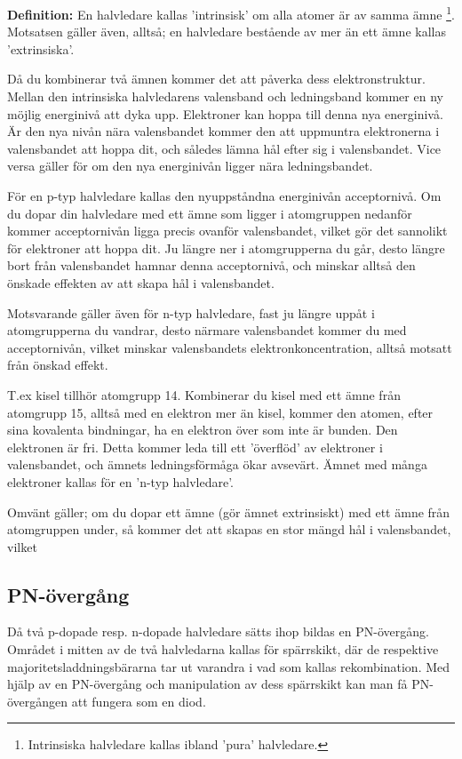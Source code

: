 \textbf{Definition:} En halvledare kallas 'intrinsisk' om alla atomer är av samma ämne \footnote{Intrinsiska halvledare kallas ibland 'pura' halvledare.}. Motsatsen gäller även, alltså; en halvledare bestående av mer än ett ämne kallas 'extrinsiska'.

Då du kombinerar två ämnen kommer det att påverka dess elektronstruktur. Mellan den intrinsiska halvledarens valensband och ledningsband kommer en ny möjlig energinivå att dyka upp. Elektroner kan hoppa till denna nya energinivå. Är den nya nivån nära valensbandet kommer den att uppmuntra elektronerna i valensbandet att hoppa dit, och således lämna hål efter sig i valensbandet. Vice versa gäller för om den nya energinivån ligger nära ledningsbandet.

För en p-typ halvledare kallas den nyuppståndna energinivån acceptornivå. Om du dopar din halvledare med ett ämne som ligger i atomgruppen nedanför kommer acceptornivån ligga precis ovanför valensbandet, vilket gör det sannolikt för elektroner att hoppa dit. Ju längre ner i atomgrupperna du går, desto längre bort från valensbandet hamnar denna acceptornivå, och minskar alltså den önskade effekten av att skapa hål i valensbandet.

Motsvarande gäller även för n-typ halvledare, fast ju längre uppåt i atomgrupperna du vandrar, desto närmare valensbandet kommer du med acceptornivån, vilket minskar valensbandets elektronkoncentration, alltså motsatt från önskad effekt.

T.ex kisel tillhör atomgrupp 14. Kombinerar du kisel med ett ämne från atomgrupp 15, alltså med en elektron mer än kisel, kommer den atomen, efter sina kovalenta bindningar, ha en elektron över som inte är bunden. Den elektronen är fri. Detta kommer leda till ett 'överflöd' av elektroner i valensbandet, och ämnets ledningsförmåga ökar avsevärt. Ämnet med många elektroner kallas för en 'n-typ halvledare'.

Omvänt gäller; om du dopar ett ämne (gör ämnet extrinsiskt) med ett ämne från atomgruppen under, så kommer det att skapas en stor mängd hål i valensbandet, vilket 

\subsection{PN-övergång}

Då två p-dopade resp. n-dopade halvledare sätts ihop bildas en PN-övergång. Området i mitten av de två halvledarna kallas för spärrskikt, där de respektive majoritetsladdningsbärarna tar ut varandra i vad som kallas rekombination. Med hjälp av en PN-övergång och manipulation av dess spärrskikt kan man få PN-övergången att fungera som en diod.

